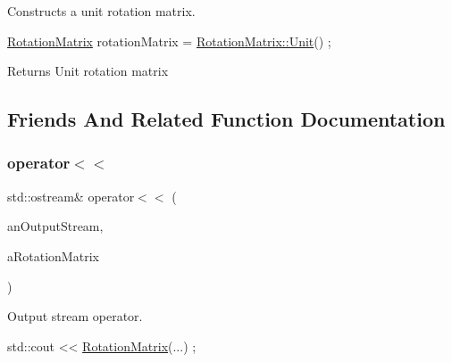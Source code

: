 Constructs a unit rotation matrix. 


\begin{DoxyCode}
\hyperlink{classlibrary_1_1math_1_1geom_1_1trf_1_1rot_1_1_rotation_matrix_a667d2c05aa5b0cc88775938d11164cdc}{RotationMatrix} rotationMatrix = \hyperlink{classlibrary_1_1math_1_1geom_1_1trf_1_1rot_1_1_rotation_matrix_aac59b7dafc34767d24d0934f4b86bef0}{RotationMatrix::Unit}() ;
\end{DoxyCode}


\begin{DoxyReturn}{Returns}
Unit rotation matrix 
\end{DoxyReturn}


\subsection{Friends And Related Function Documentation}
\mbox{\label{classlibrary_1_1math_1_1geom_1_1trf_1_1rot_1_1_rotation_matrix_aa9ed0897a6219331deeb7750017a0df9}} 
\subsubsection{\texorpdfstring{operator$<$$<$}{operator<<}}
{\footnotesize\ttfamily std\+::ostream\& operator$<$$<$ (\begin{DoxyParamCaption}\item[{std\+::ostream \&}]{an\+Output\+Stream,  }\item[{const \hyperlink{classlibrary_1_1math_1_1geom_1_1trf_1_1rot_1_1_rotation_matrix}{Rotation\+Matrix} \&}]{a\+Rotation\+Matrix }\end{DoxyParamCaption})\hspace{0.3cm}{\ttfamily [friend]}}



Output stream operator. 


\begin{DoxyCode}
std::cout << \hyperlink{classlibrary_1_1math_1_1geom_1_1trf_1_1rot_1_1_rotation_matrix_a667d2c05aa5b0cc88775938d11164cdc}{RotationMatrix}(...) ;
\end{DoxyCode}



